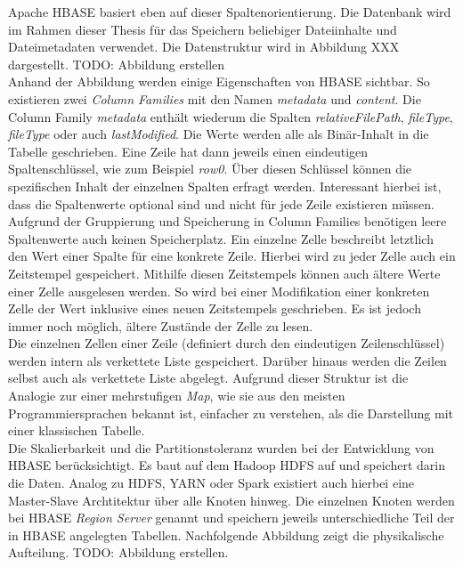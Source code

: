 \noindent
Apache HBASE basiert eben auf dieser Spaltenorientierung. Die Datenbank wird im Rahmen dieser Thesis für das Speichern beliebiger Dateiinhalte und Dateimetadaten verwendet. Die Datenstruktur wird in Abbildung XXX dargestellt. TODO: Abbildung erstellen \\

\noindent
Anhand der Abbildung werden einige Eigenschaften von HBASE sichtbar. So existieren zwei \textit{Column Families} mit den Namen \textit{metadata} und \textit{content}. Die Column Family \textit{metadata} enthält wiederum die Spalten \textit{relativeFilePath}, \textit{fileType}, \textit{fileType} oder auch \textit{lastModified}. Die Werte werden alle als Binär-Inhalt in die Tabelle geschrieben. Eine Zeile hat dann jeweils einen eindeutigen Spaltenschlüssel, wie zum Beispiel \textit{row0}. Über diesen Schlüssel können die spezifischen Inhalt der einzelnen Spalten erfragt werden. Interessant hierbei ist, dass die Spaltenwerte optional sind und nicht für jede Zeile existieren müssen. Aufgrund der Gruppierung und Speicherung in Column Families benötigen leere Spaltenwerte auch keinen Speicherplatz. Ein einzelne Zelle beschreibt letztlich den Wert einer Spalte für eine konkrete Zeile. Hierbei wird zu jeder Zelle auch ein Zeitstempel gespeichert. Mithilfe diesen Zeitstempels können auch ältere Werte einer Zelle ausgelesen werden. So wird bei einer Modifikation einer konkreten Zelle der Wert inklusive eines neuen Zeitstempels geschrieben. Es ist jedoch immer noch möglich, ältere Zustände der Zelle zu lesen.\\

\noindent
Die einzelnen Zellen einer Zeile (definiert durch den eindeutigen Zeilenschlüssel)
werden intern als verkettete Liste gespeichert. Darüber hinaus werden die Zeilen selbst auch als verkettete Liste abgelegt. Aufgrund dieser Struktur ist die Analogie zur einer mehrstufigen \textit{Map}, wie sie aus den meisten Programmiersprachen bekannt ist, einfacher zu verstehen, als die Darstellung mit einer klassischen Tabelle.\\


\noindent
Die Skalierbarkeit und die Partitionstoleranz wurden bei der Entwicklung von HBASE berücksichtigt. Es baut auf dem Hadoop HDFS auf und speichert darin die Daten. Analog zu HDFS, YARN oder Spark existiert auch hierbei eine Master-Slave Archtitektur über alle Knoten hinweg. Die einzelnen Knoten werden bei HBASE \textit{Region Server} genannt und speichern jeweils unterschiedliche Teil der in HBASE angelegten Tabellen. Nachfolgende Abbildung zeigt die physikalische Aufteilung. TODO: Abbildung erstellen.\\

